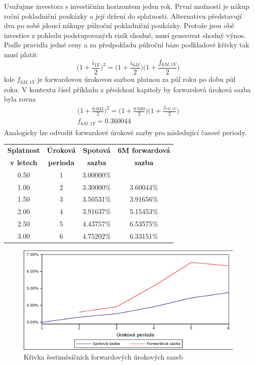 \documentclass[a4paper]{book}
\begin{document}
Uvažujme investora s investičním horizontem jeden rok. První možností je nákup roční pokladniční poukázky a její držení do splatnosti. Alternativu představují dva po sobě jdoucí nákupy půlroční pokladniční poukázky. Protože jsou obě investice z pohledu podstupovaných rizik shodné, musí generovat shodný výnos. Podle pravidla jedné ceny a za předpokladu půlroční báze podkladové křivky tak musí platit
\begin{equation}
\Big(1 + \frac{i_{1Y}}{2} \Big)^2 = \Bigg(1 + \frac{i_{6M}}{2} \Bigg) \Bigg(1 + \frac{f_{6M,1Y}}{2} \Bigg) 
\end{equation}
kde $f_{6M, 1Y}$ je forwardovou úrokovou sazbou platnou za půl roku po dobu půl roku. V kontextu čísel příkladu z předchozí kapitoly by forwardová úroková sazba byla rovna
\begin{gather*}
\Bigg(1 + \frac{0.033}{2} \Bigg)^2 = \Big(1 + \frac{0.030}{2} \Big) \Big(1 + \frac{f_{6M,1Y}}{2} \Big)\\
f_{6M,1Y} = 0.360044
\end{gather*}
Analogicky lze odvodit forwardové úrokové sazby pro následující časové periody.
\begin{center}
\begin{tabular}{c c c c}
\textbf{Splatnost} & \textbf{Úroková} & \textbf{Spotová} & \textbf{6M forwardová}\\
\textbf{v letech} & \textbf{perioda} & \textbf{sazba} & \textbf{sazba}\\
\hline
0.50 & 1 & 3.00000\% &          \\
1.00 & 2 & 3.30000\% & 3.60044\% \\
1.50 & 3 & 3.50531\% & 3.91656\% \\
2.00 & 4 & 3.91637\% & 5.15453\% \\
2.50 & 5 & 4.43757\% & 6.53575\% \\		
3.00 & 6 & 4.75202\% & 6.33151\%
\end{tabular}
\end{center}
\begin{figure}
  \centering
  \includegraphics[scale=0.75]{forward_curve.eps}
  \caption{Křivka šestiměsíčních forwardových úrokových sazeb}
  \label{spot_curve}
\end{figure}
\end{document}
